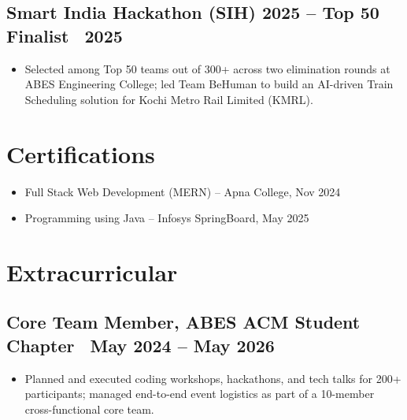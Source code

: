 \documentclass[11pt, a4paper]{article}
\begin{document}
\subsection*{Smart India Hackathon (SIH) 2025 -- Top 50 Finalist \textbar\ 2025}
\begin{itemize}
\item Selected among Top 50 teams out of 300+ across two elimination rounds at ABES Engineering College; led Team BeHuman to build an AI-driven Train Scheduling solution for Kochi Metro Rail Limited (KMRL).
\end{itemize}

\section*{Certifications}

\begin{itemize}
\item Full Stack Web Development (MERN) -- Apna College, Nov 2024
\item Programming using Java -- Infosys SpringBoard, May 2025
\end{itemize}

\section*{Extracurricular}

\subsection*{Core Team Member, ABES ACM Student Chapter \textbar\ May 2024 -- May 2026}
\begin{itemize}
\item Planned and executed coding workshops, hackathons, and tech talks for 200+ participants; managed end-to-end event logistics as part of a 10-member cross-functional core team.
\end{itemize}
\end{document}
